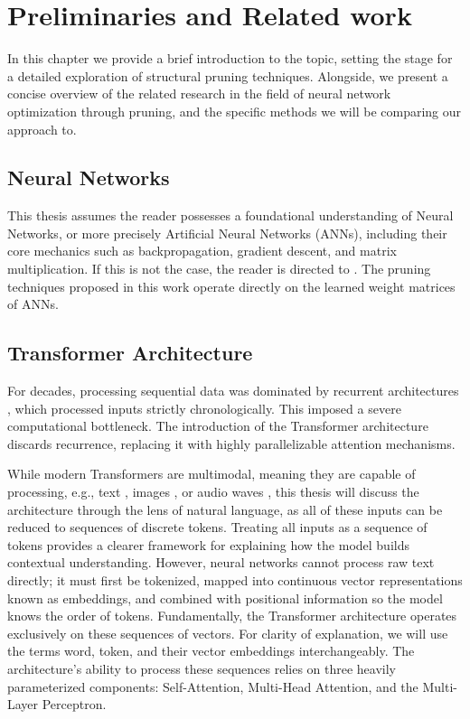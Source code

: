 \chapter{Preliminaries and Related work}
\label{chap:preliminaries}

In this chapter we provide a brief introduction to the topic, setting the stage for a detailed exploration of structural pruning techniques. Alongside, we present a concise overview of the related research in the field of neural network optimization through pruning, and the specific methods we will be comparing our approach to.

\section{Neural Networks}

This thesis assumes the reader possesses a foundational understanding of Neural Networks, or more precisely Artificial Neural Networks (ANNs), including their core mechanics such as backpropagation, gradient descent, and matrix multiplication. If this is not the case, the reader is directed to \cite{deep_learning}. The pruning techniques proposed in this work operate directly on the learned weight matrices of ANNs.

\section{Transformer Architecture}

For decades, processing sequential data was dominated by recurrent architectures \cite{chung2014empiricalevaluationgatedrecurrent,sutskever2014sequencesequencelearningneural,bahdanau2016neuralmachinetranslationjointly}, which processed inputs strictly chronologically. This imposed a severe computational bottleneck. The introduction of the Transformer architecture \cite{transformer} discards recurrence, replacing it with highly parallelizable attention mechanisms.

While modern Transformers are multimodal, meaning they are capable of processing, e.g., text \cite{brown2020languagemodelsfewshotlearners}, images \cite{dosovitskiy2020vit}, or audio waves \cite{gong2021ast}, this thesis will discuss the architecture through the lens of natural language, as all of these inputs can be reduced to sequences of discrete tokens. Treating all inputs as a sequence of tokens provides a clearer framework for explaining how the model builds contextual understanding. However, neural networks cannot process raw text directly; it must first be tokenized, mapped into continuous vector representations known as embeddings, and combined with positional information so the model knows the order of tokens. Fundamentally, the Transformer architecture operates exclusively on these sequences of vectors. For clarity of explanation, we will use the terms word, token, and their vector embeddings interchangeably. The architecture’s ability to process these sequences relies on three heavily parameterized components: Self-Attention, Multi-Head Attention, and the Multi-Layer Perceptron.

